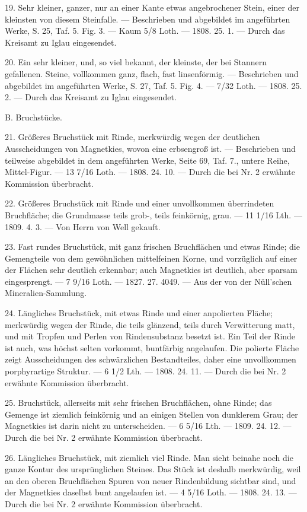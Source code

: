 \documentclass[a4paper, 11pt, oneside, polutonikogreek, german]{article}
\begin{document}
19. Sehr kleiner, ganzer, nur an einer Kante etwas angebrochener Stein, einer der kleinsten von diesem Steinfalle. — Beschrieben und abgebildet im angeführten Werke, S. 25, Taf. 5. Fig. 3. — Kaum 5/8 Loth. — 1808. 25. 1. — Durch das Kreisamt zu Iglau eingesendet.

20. Ein sehr kleiner, und, so viel bekannt, der kleinste, der bei Stannern gefallenen. Steine, vollkommen ganz, flach, fast linsenförmig. — Beschrieben und abgebildet im angeführten Werke, S. 27, Taf. 5. Fig. 4. — 7/32 Loth. — 1808. 25. 2. — Durch das Kreisamt zu Iglau eingesendet.

B. Bruchstücke.

21. Größeres Bruchstück mit Rinde, merkwürdig wegen der deutlichen Ausscheidungen von Magnetkies, wovon eine erbsengroß ist. — Beschrieben und teilweise abgebildet in dem angeführten Werke, Seite 69, Taf. 7., untere Reihe, Mittel-Figur. — 13 7/16 Loth. — 1808. 24. 10. — Durch die bei Nr. 2 erwähnte Kommission überbracht.

22. Größeres Bruchstück mit Rinde und einer unvollkommen überrindeten Bruchfläche; die Grundmasse teils grob-, teils feinkörnig, grau. — 11 1/16 Lth. — 1809. 4. 3. — Von Herrn von Well gekauft.

23. Fast rundes Bruchstück, mit ganz frischen Bruchflächen und etwas Rinde; die Gemengteile von dem gewöhnlichen mittelfeinen Korne, und vorzüglich auf einer der Flächen sehr deutlich erkennbar; auch Magnetkies ist deutlich, aber sparsam eingesprengt. — 7 9/16 Loth. — 1827. 27. 4049. — Aus der von der Nüll’schen Mineralien-Sammlung.

24. Längliches Bruchstück, mit etwas Rinde und einer anpolierten Fläche; merkwürdig wegen der Rinde, die teils glänzend, teils durch Verwitterung matt, und mit Tropfen und Perlen von Rindensubstanz besetzt ist. Ein Teil der Rinde ist auch, was höchst selten vorkommt, buntfärbig angelaufen. Die polierte Fläche zeigt Ausscheidungen des schwärzlichen Bestandteiles, daher eine unvollkommen porphyrartige Struktur. — 6 1/2 Lth. — 1808. 24. 11. — Durch die bei Nr. 2 erwähnte Kommission überbracht.

25. Bruchstück, allerseits mit sehr frischen Bruchflächen, ohne Rinde; das Gemenge ist ziemlich feinkörnig und an einigen Stellen von dunklerem Grau; der Magnetkies ist darin nicht zu unterscheiden. — 6 5/16 Lth. — 1809. 24. 12. — Durch die bei Nr. 2 erwähnte Kommission überbracht.

26. Längliches Bruchstück, mit ziemlich viel Rinde. Man sieht beinahe noch die ganze Kontur des ursprünglichen Steines. Das Stück ist deshalb merkwürdig, weil an den oberen Bruchflächen Spuren von neuer Rindenbildung sichtbar sind, und der Magnetkies daselbst bunt angelaufen ist. — 4 5/16 Loth. — 1808. 24. 13. — Durch die bei Nr. 2 erwähnte Kommission überbracht.
\end{document}
